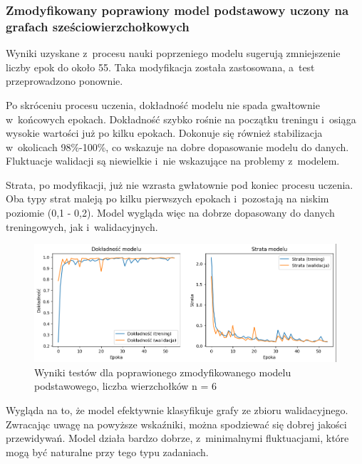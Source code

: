 
\subsubsection{Zmodyfikowany poprawiony model podstawowy uczony na grafach sześciowierzchołkowych}

Wyniki uzyskane z~procesu nauki poprzeniego modelu sugerują zmniejszenie liczby epok do około 55.
Taka modyfikacja została zastosowana, a~test przeprowadzono ponownie.

Po skróceniu procesu uczenia, dokładność modelu nie spada gwałtownie w~końcowych epokach.
Dokładność szybko rośnie na początku treningu i~osiąga wysokie wartości już po kilku epokach.
Dokonuje się również stabilizacja w~okolicach 98\%-100\%, co wskazuje na dobre dopasowanie modelu do danych.
Fluktuacje walidacji są niewielkie i~nie wskazujące na problemy z~modelem.

Strata, po modyfikacji, już nie wzrasta gwłatownie pod koniec procesu uczenia.
Oba typy strat maleją po kilku pierwszych epokach i~pozostają na niskim poziomie (0,1 - 0,2).
Model wygląda więc na dobrze dopasowany do danych treningowych, jak i~walidacyjnych.

\begin{figure}[ht]
	\centering
	\includegraphics[width=15.5cm]{resources/tests/images/v4/base6_1_1_img.png}
	\caption{Wyniki testów dla poprawionego zmodyfikowanego modelu podstawowego, liczba wierzchołków n = 6}
	\label{Fig:tests-best-1a}
\end{figure}
\FloatBarrier

Wygląda na to, że model efektywnie klasyfikuje grafy ze zbioru walidacyjnego.
Zwracając uwagę na powyższe wskaźniki, można spodziewać się dobrej jakości przewidywań.
Model działa bardzo dobrze, z~minimalnymi fluktuacjami, które mogą być naturalne przy tego typu zadaniach.

